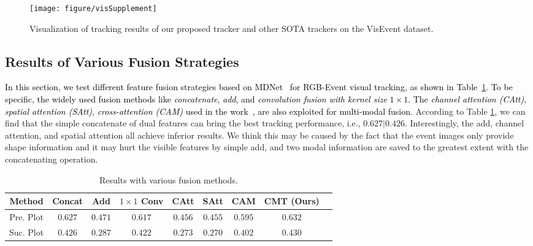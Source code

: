 \documentclass[journal]{IEEEtran}
\begin{document}
\begin{figure}[!htp]
\center
\texttt{[image: figure/visSupplement]}
\caption{Visualization of tracking results of our proposed tracker and other SOTA trackers on the VisEvent dataset.}    
\label{visResults}
\end{figure} 	




\subsection{Results of Various Fusion Strategies}   

\textcolor{black}{
In this section, we test different feature fusion strategies based on MDNet~\cite{Nam2015Learning} for RGB-Event visual tracking, as shown in Table~\ref{FusionAnalysis}. To be specific, the widely used fusion methods like \emph{concatenate}, \emph{add}, and \emph{convolution fusion with kernel size} $1 \times 1$. The \emph{channel attention (CAtt)}, \emph{spatial attention (SAtt)}, \emph{cross-attention (CAM)} used in the work~\cite{suo2021CAM}, are also exploited for multi-modal fusion. 
}
According to Table \ref{FusionAnalysis}, we can find that the simple concatenate of dual features can bring the best tracking performance, i.e., $0.627|0.426$. Interestingly, the add, channel attention, and spatial attention all achieve inferior results. We think this may be caused by the fact that the event images only provide shape information and it may hurt the visible features by simple add, and two modal information are saved to the greatest extent with the concatenating operation. 

\begin{table}[!htp]
\center
\tiny 
\caption{Results with various fusion methods.} \label{FusionAnalysis} 
\begin{tabular}{c|cccccccc}  
\hline \toprule [0.5 pt] 
Method 		&Concat  			&Add 			&$1 \times 1$ Conv 	  	&CAtt				&SAtt 		 &CAM  &CMT (Ours) \\
\hline 
Pre. Plot 		&$0.627$				&$0.471$ 	&$0.617$ 						&$0.456$   		 &$0.455$   	 		&$0.595$	   &$0.632$   \\
Suc. Plot 		&$0.426$				&$0.287$ 	&$0.422$ 						&$0.273$   		 &$0.270$   	 		&$0.402$    &$0.430$	 \\
\hline \toprule [0.5 pt]
\end{tabular}
\end{table} 
\end{document}
